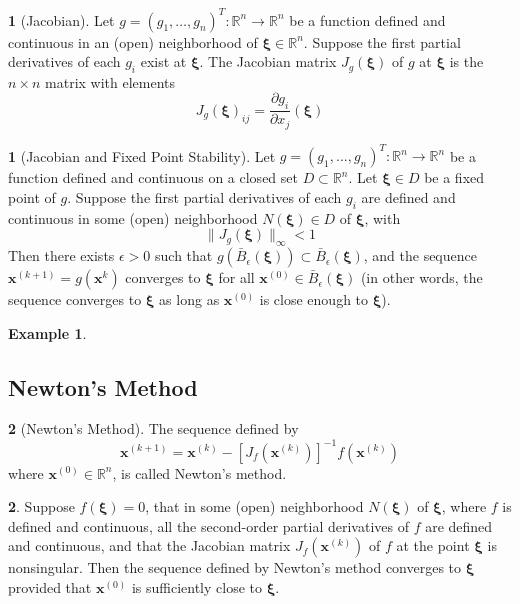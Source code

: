 \documentclass[12pt]{article}
\theoremstyle{definition}
\newtheorem{definition}{\color{NavyBlue}{\textbf{Definition}}}
\newtheorem{theorem}{\color{ForestGreen}{\textbf{Theorem}}}
\newcommand{\e}{\epsilon}
\newcommand{\R}{\mathbb{R}}
\newcommand{\norm}[1]{\lVert#1\rVert}
\newcommand{\x}{\bm{x}}
\newcommand{\xib}{\bm{\xi}}
\newtheorem{example}{\color{WildStrawberry}Example}
\theoremstyle{definition}
\begin{document}
\begin{definition}[Jacobian]
Let $g = (g_1, \ldots, g_n)^T : \R^n \to \R^n$ be a function defined and continuous in an (open) neighborhood of $\xib \in \R^n$. Suppose the first partial derivatives of each $g_i$ exist at $\xib$. The Jacobian matrix $J_g(\xib)$ of $g$ at $\xib$ is the $n \times n$ matrix with elements
\begin{equation}
	J_g(\xib)_{ij} = \frac{\partial g_i}{\partial x_j} (\xib) 
\end{equation}
\end{definition}

\begin{theorem}[Jacobian and Fixed Point Stability]
Let $g = (g_1, \ldots, g_n)^T : \R^n \to \R^n$ be a function defined and continuous on a closed set $D \subset \R^n$. Let $\xib \in D$ be a fixed point of $g$. Suppose the first partial derivatives of each $g_i$ are defined and continuous in some (open) neighborhood $N(\xib) \in D$ of $\xib$, with 
\begin{equation}
	\norm{J_g(\xib)}_\infty < 1  	
\end{equation}
Then there exists $\e > 0$ such that $g (\bar B_\e(\xib)) \subset \bar B_\e(\xib)$, and the sequence $\x^{(k+1)} = g(\x^{k})$ converges to $\xib$ for all $\x^{(0)} \in \bar B_\e(\xib)$ (in other words, the sequence converges to $\xib$ as long as $\x^{(0)}$ is close enough to $\xib$).
\end{theorem}

\begin{example}

\end{example}

\subsection*{Newton's Method}
\begin{definition}[Newton's Method]
	The sequence defined by
	\begin{equation}
		\x^{(k+1)} = \x^{(k)} - [J_f(\x^{(k)})]^{-1} f(\x^{(k)})
	\end{equation}
	where $\x^{(0)} \in \R^n$, is called Newton's method. 
\end{definition}

\begin{theorem}
Suppose $f(\xib) = 0$, that in some (open) neighborhood $N(\xib)$ of $\xib$, where $f$ is defined and continuous, all the second-order partial derivatives of $f$ are defined and continuous, and that the Jacobian matrix $J_f(\x^{(k)})$ of $f$ at the point $\xib$ is nonsingular. Then the sequence defined by Newton's method converges to $\xib$ provided that $\x^{(0)}$ is sufficiently close to $\xib$. 
\end{theorem}
\end{document}

